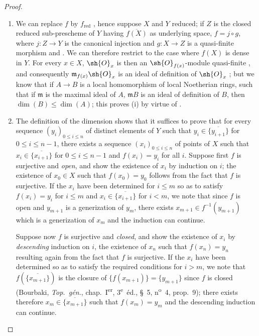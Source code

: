 \begin{proof}
\begin{enumerate}[label=(\roman*)]
  \item We can replace $f$ by $f_{\mathrm{red}}$ , hence suppose $X$ and $Y$ reduced; if $Z$ is the closed reduced sub-prescheme of $Y$ having $\overline{f(X)}$ as underlying space, $f=j\circ g$, where $j:Z\to Y$ is the canonical injection and $g:X\to Z$ is a quasi-finite morphism  and .
We can therefore restrict to the case where $f(X)$ is dense in $Y$.
For every $x\in X$, $\sh{O}_x$ is then an $\sh{O}_{f(x)}$-module quasi-finite , and consequently $\mathfrak{m}_{f(x)}\sh{O}_x$ is an ideal of definition of $\sh{O}_x$ ; but we know  that if $A\to B$ is a local homomorphism of local Noetherian rings, such that if $\mathfrak{m}$ is the maximal ideal of $A$, $\mathfrak{m}B$ is an ideal of definition of $B$, then $\dim(B)\leq\dim(A)$; this proves (i) by virtue of .
  \item The definition of the dimension  shows that it suffices to prove that for every sequence $(y_i)_{0\leq i\leq n}$ of distinct elements of $Y$ such that $y_i\in\overline{\{y_{i+1}\}}$ for $0\leq i\leq n-1$, there exists a sequence $(x_i)_{0\leq i\leq n}$ of points of $X$ such that $x_i\in\overline{\{x_{i+1}\}}$ for $0\leq i\leq n-1$ and $f(x_i)=y_i$ for all $i$.
Suppose first $f$ is surjective and \emph{open}, and show the existence of $x_i$ by induction on $i$; the existence of $x_0\in X$ such that $f(x_0)=y_0$ follows from the fact that $f$ is surjective.
If the $x_i$ have been determined for $i\leq m$ so as to satisfy $f(x_i)=y_i$ for $i\leq m$ and $x_i\in\overline{\{x_{i+1}\}}$ for $i<m$, we note that since $f$ is open and $y_{m+1}$ is a generization of $y_m$, there exists $x_{m+1}\in f^{-1}(y_{m+1})$ which is a generization of $x_m$  and the induction can continue.

Suppose now $f$ is surjective and \emph{closed}, and show the existence of $x_i$ by \emph{descending} induction on $i$, the existence of $x_n$ such that $f(x_n)=y_n$ resulting again from the fact that $f$ is surjective.
If the $x_i$ have been determined so as to satisfy the required conditions for $i>m$, we note that $f(\overline{\{x_{m+1}\}})$ is the closure of $\{f(x_{m+1})\}=\{y_{m+1}\}$ since $f$ is closed (Bourbaki, \emph{Top.\ g\'{e}n.}, chap.~I\textsuperscript{er}, 3\textsuperscript{e}~\'{e}d., \S~5, n\textsuperscript{o}~4, prop.~9); there exists therefore $x_m\in\overline{\{x_{m+1}\}}$ such that $f(x_m)=y_m$ and the descending induction can continue.
\end{enumerate}
\end{proof}

